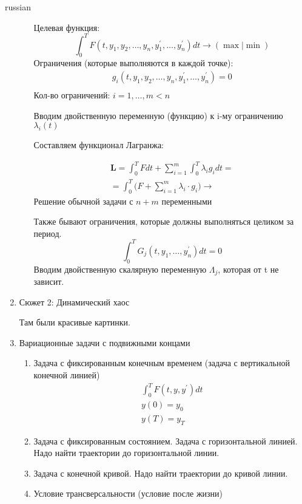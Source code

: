 \documentclass{article}
\begin{document}
\begin{otherlanguage*}{russian}
\begin{enumerate}
\begin{enumerate}
Целевая функция:
\begin{equation}
\int_0^T F(t, y_1, y_2, \ldots, y_n, y^{'}_1, \ldots, y^{'}_n) dt \rightarrow (\max | \min) 
\end{equation}
Ограничения (которые выполняются в каждой точке):
\begin{align} 
g_i (t, y_1, y_2, \ldots, y_n, y^{'}_1, \ldots, y^{'}_n) = 0 \\
\end{align} 
Кол-во ограничений: $i = 1, \ldots, m < n $

Вводим двойственную переменную (функцию) к i-му ограничению $ \lambda_i (t) $

Составляем функционал Лагранжа:

\begin{align} 
\mathbf{L} = \int_0^T F dt + \sum_{i=1}^m \int_0^T \lambda_i g_i dt = \\
= \int_0^T \Big( F + \sum_{i=1}^m \lambda_i \cdot g_i \Big) \rightarrow
\end{align} 
Решение обычной задачи с $ n + m $ переменными

Также бывают ограничения, которые должны выполняться целиком за период.
\begin{equation}
\int_0^T G_j (t, y_1, \ldots, y^{'}_n) dt = 0
\end{equation}
Вводим двойственную скалярную переменную $ \Lambda_j$, которая от t не зависит. 
\end{enumerate}
\item Сюжет 2: Динамический хаос 

Там были красивые картинки. 

\item Вариационные задачи с подвижными концами 
\begin{enumerate}
\item Задача с фиксированным конечным временем (задача с вертикальной конечной линией) 
\begin{align}
\int_0^T F(t, y, y^{'}) dt \\ 
y(0) = y_0 \\ 
y(T) = y_T 
\end{align} 
\item Задача с фиксированным состоянием. Задача с горизонтальной линией. Надо найти траектории до горизонтальной линии. 

\item Задача с конечной кривой. Надо найти траектории до кривой линии. 

\item Условие трансверсальности (условие после жизни) 


\end{enumerate}
\end{enumerate}
\end{otherlanguage*}
\end{document}
